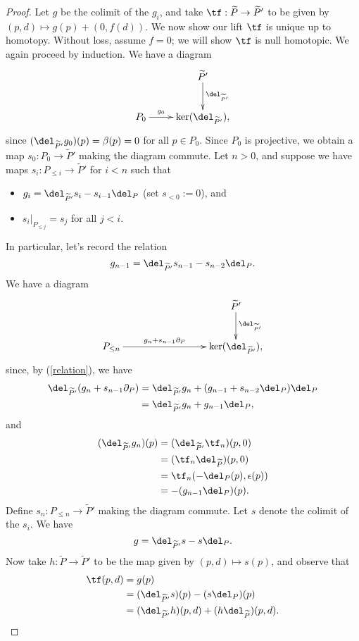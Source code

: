 \documentclass[12pt]{amsart}
\theoremstyle{definition}
\theoremstyle{remark}
\def\tP{\widetilde{P}}
\begin{document}
\begin{proof}
Let $g$ be the colimit of the $g_i$, and take $\tf : \tP \to \tP'$ to be given by $(p, d) \mapsto g(p) + (0, f(d))$. We now show our lift $\tf$ is unique up to homotopy. Without loss, assume $f = 0$; we will show $\tf$ is null homotopic. We again proceed by induction. We have a diagram
$$
\xymatrix{
& \tP' \ar[d]^-{\del_{\tP'}} \\
P_0 \ar[r]^-{g_0} & \ker(\del_{\tP'}),
}
$$
since $(\del_{\tP'}  g_0)(p) = \beta(p)=0 $ for all $p \in P_0$. Since $P_0$ is projective, we obtain a map $s_0 : P_0 \to \tP'$ making the diagram commute. Let $n > 0$, and suppose we have maps $s_i : P_{\le i} \to \tP'$ for $i < n$ such that
\begin{itemize}
\item $g_i =  \del_{\tP'}   s_i - s_{i - 1}  \del_{P} $ (set $s_{<0} := 0$), and 
\item $s_{i}|_{P_{\le j}} = s_{j }$ for all $j < i$. 
\end{itemize}
In particular, let's record the relation
\begin{equation}
\label{relation}
g_{n-1} = \del_{\tP'}   s_{n-1} - s_{n-2}  \del_{P} .
\end{equation}
We have a diagram
$$
\xymatrix{
&&& \tP' \ar[d]^-{\del_{\tP'}} \\
P_{\le n} \ar[rrr]^-{g_{n} + s_{n-1}  \partial_{P}} &&& \ker(\del_{\tP'}),
}
$$
since, by (\ref{relation}), we have
\begin{align*}
\del_{\tP'}  (g_n + s_{n-1}  \partial_{P}) &= \del_{\tP'}  g_{n} + ( g_{n-1} + s_{n-2}  \del_P ) \del_P \\
&= \del_{\tP'}  g_{n}  +  g_{n-1}  \del_P,
\end{align*}
and
\begin{align*}
(\del_{\tP'}  g_{n} )(p) &= (\del_{\tP'}  \tf_{n})(p, 0)\\
& = (\tf_{n}  \del_{\tP})(p, 0) \\
&= \tf_{n}(-\del_P(p), \epsilon(p)) \\
&= -(g_{n-1}  \del_P)(p).
\end{align*}
Define $s_{n} : P_{\le n} \to \tP'$ making the diagram commute. Let $s$ denote the colimit of the $s_i$. We have 
$$
g=  \del_{\tP'}  s - s   \del_P.
$$
Now take $h : \tP \to \tP'$ to be the map given by $(p, d) \mapsto s(p)$, and observe that
\begin{align*}
\tf(p, d) & = g(p) \\
&= (\del_{\tP'}  s)(p)  - (s  \del_P)(p) \\
& = (\del_{\tP'}  h)(p, d) + (h  \del_{\tP})(p, d). \\
\end{align*}
\end{proof}
\end{document}
